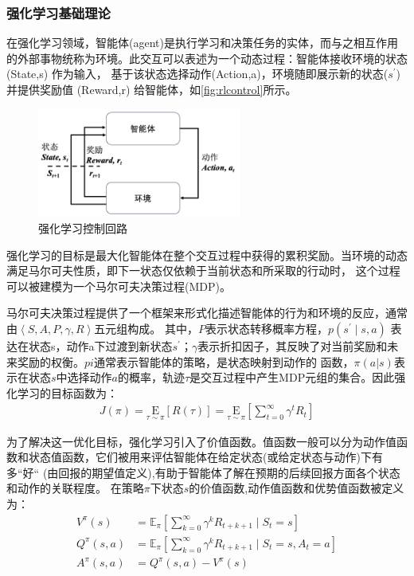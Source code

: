 \subsubsection{强化学习基础理论}
在强化学习领域，智能体(agent)是执行学习和决策任务的实体，而与之相互作用的外部事物统称为环境。此交互可以表述为一个动态过程：智能体接收环境的状态(State,s) 作为输入，
基于该状态选择动作(Action,a)，环境随即展示新的状态($s^{'}$)并提供奖励值 (Reward,r) 给智能体，如\autoref{fig:rlcontrol}所示。
\begin{figure}
    \centering
    \includegraphics[width=0.6\textwidth]{figure/chapter1/强化学习.png}
    \caption{\label{fig:rlcontrol}强化学习控制回路}
\end{figure}

强化学习的目标是最大化智能体在整个交互过程中获得的累积奖励。当环境的动态满足马尔可夫性质，即下一状态仅依赖于当前状态和所采取的行动时，
这个过程可以被建模为一个马尔可夫决策过程(MDP)。

马尔可夫决策过程提供了一个框架来形式化描述智能体的行为和环境的反应，通常由$\left \langle S,A,P,\gamma,R \right \rangle$五元组构成。
其中，$P$表示状态转移概率方程，$p\left(s^{\prime} \mid s, a\right)$
表达在状态s，动作a下过渡到新状态$s^{'}$；$\gamma$表示折扣因子，其反映了对当前奖励和未来奖励的权衡。$pi$通常表示智能体的策略，是状态映射到动作的
函数，$\pi(a|s)$表示在状态$s$中选择动作$a$的概率，轨迹$\tau$是交互过程中产生MDP元组的集合。因此强化学习的目标函数为：
\begin{align}
        J(\pi)=\underset{\tau \sim \pi }{\mathrm{E}}\left [ R(\tau) \right ]=\underset{\tau \sim \pi }{\mathrm{E}}\left[\sum_{t=0}^{\infty} \gamma^{t} R_{t}\right]
\end{align}

为了解决这一优化目标，强化学习引入了价值函数。值函数一般可以分为动作值函数和状态值函数，它们被用来评估智能体在给定状态(或给定状态与动作)下有多“好“
(由回报的期望值定义),有助于智能体了解在预期的后续回报方面各个状态和动作的关联程度。
在策略$\pi$下状态$s$的价值函数,动作值函数和优势值函数被定义为：
\begin{align}
    V^{\pi}\left(s\right) & = \mathbb{E}_{\pi }\left[\sum_{k = 0}^{\infty} \gamma^{k} R_{t+k+1}\mid S_{t}= s\right]\\
    Q^{\pi}\left(s, a\right) &=\mathbb{E}_{\pi }\left[\sum_{k = 0}^{\infty} \gamma^{k} R_{t+k+1}\mid S_{t}= s,A_{t}=a\right]\\
    A^{\pi}(s, a)&=Q^{\pi}(s, a)-V^{\pi}(s)
\end{align}

